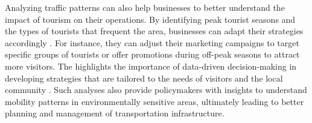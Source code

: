 Analyzing traffic patterns can also help businesses to better understand the impact of tourism on their operations. By identifying peak tourist seasons and the types of tourists that frequent the area, businesses can adapt their strategies accordingly \cite{blazquez2021identifying}. For instance, they can adjust their marketing campaigns to target specific groups of tourists or offer promotions during off-peak seasons to attract more visitors. The highlights the importance of data-driven decision-making in developing strategies that are tailored to the needs of visitors and the local community \cite{neubig2022data}. Such analyses also provide policymakers with insights to understand mobility patterns in environmentally sensitive areas, ultimately leading to better planning and management of transportation infrastructure.

\color{black}
